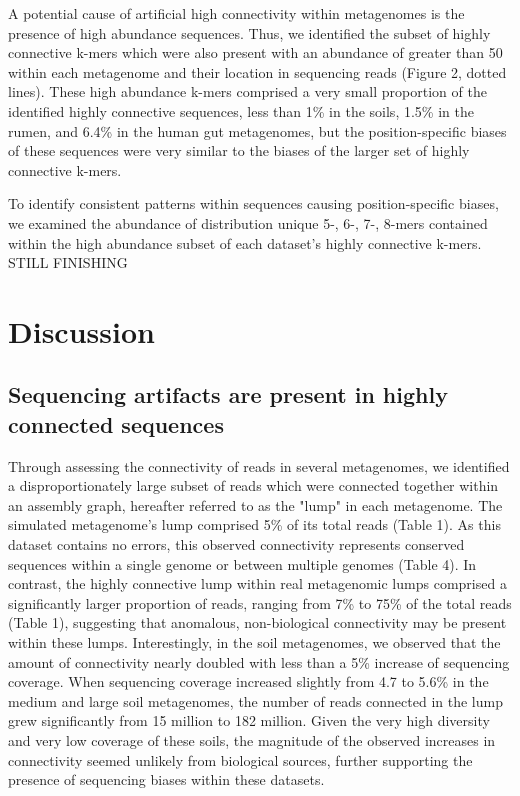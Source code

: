 \documentclass[10pt]{article}
\begin{document}
A potential cause of artificial high connectivity within metagenomes is the presence of high abundance sequences.  Thus, we identified the subset of highly connective k-mers which were also present with an abundance of greater than 50 within each metagenome and their location in sequencing reads (Figure 2, dotted lines).   These high abundance k-mers comprised a very small proportion of the identified highly connective sequences, less than 1\% in the soils, 1.5\% in the rumen, and 6.4\% in the human gut metagenomes, but the position-specific biases of these sequences were very similar to the biases of the larger set of highly connective k-mers.

To identify consistent patterns within sequences causing position-specific biases, we examined the abundance of distribution unique 5-, 6-, 7-, 8-mers contained within the high abundance subset of each dataset's highly connective k-mers. STILL FINISHING

\section*{Discussion}

\subsection*{Sequencing artifacts are present in highly connected sequences}

Through assessing the connectivity of reads in several metagenomes, we identified a disproportionately large subset of reads which were connected together within an assembly graph, hereafter referred to as the "lump" in each metagenome.  The simulated metagenome's lump comprised 5\% of its total reads (Table 1).  As this dataset contains no errors, this observed connectivity represents conserved sequences within a single genome or between multiple genomes (Table 4).  In contrast, the highly connective lump within real metagenomic lumps comprised a significantly larger proportion of reads, ranging from 7\% to 75\% of the total reads (Table 1), suggesting that anomalous, non-biological connectivity may be present within these lumps.  Interestingly, in the soil metagenomes, we observed that the amount of connectivity nearly doubled with less than a 5\% increase of sequencing coverage.  When sequencing coverage increased slightly from 4.7 to 5.6\% in the medium and large soil metagenomes, the number of reads connected in the lump grew significantly from 15 million to 182 million.  Given the very high diversity and very low coverage of these soils, the magnitude of the observed increases in connectivity seemed unlikely from biological sources, further supporting the presence of sequencing biases within these datasets.  
\end{document}
